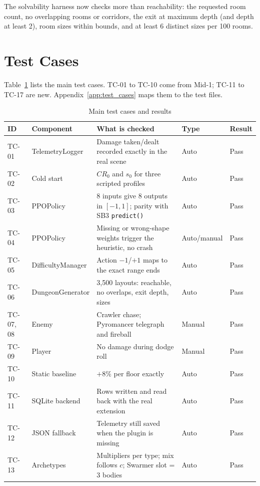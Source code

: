 The solvability harness now checks more than reachability: the requested room count, no overlapping rooms or corridors, the exit at maximum depth (and depth at least 2), room sizes within bounds, and at least 6 distinct sizes per 100 rooms.

\section{Test Cases}
Table~\ref{tab:test_cases} lists the main test cases. TC-01 to TC-10 come from Mid-1; TC-11 to TC-17 are new. Appendix~\ref{app:test_cases} maps them to the test files.

\begin{table}[!htbp]
\centering
\caption{Main test cases and results}
\label{tab:test_cases}
\scriptsize
\begin{tabular}{p{}p{}p{}p{}p{}}
\toprule
\textbf{ID} & \textbf{Component} & \textbf{What is checked} & \textbf{Type} & \textbf{Result} \\
\midrule
TC-01 & TelemetryLogger & Damage taken/dealt recorded exactly in the real scene & Auto & Pass \\
TC-02 & Cold start & $CR_0$ and $s_0$ for three scripted profiles & Auto & Pass \\
TC-03 & PPOPolicy & 8 inputs give 8 outputs in $[-1,1]$; parity with SB3 \texttt{predict()} & Auto & Pass \\
TC-04 & PPOPolicy & Missing or wrong-shape weights trigger the heuristic, no crash & Auto/manual & Pass \\
TC-05 & DifficultyManager & Action $-1$/$+1$ maps to the exact range ends & Auto & Pass \\
TC-06 & DungeonGenerator & 3,500 layouts: reachable, no overlaps, exit depth, sizes & Auto & Pass \\
TC-07, 08 & Enemy & Crawler chase; Pyromancer telegraph and fireball & Manual & Pass \\
TC-09 & Player & No damage during dodge roll & Manual & Pass \\
TC-10 & Static baseline & $+8\%$ per floor exactly & Auto & Pass \\
TC-11 & SQLite backend & Rows written and read back with the real extension & Auto & Pass \\
TC-12 & JSON fallback & Telemetry still saved when the plugin is missing & Auto & Pass \\
TC-13 & Archetypes & Multipliers per type; mix follows $c$; Swarmer slot = 3 bodies & Auto & Pass \\

\end{tabular}
\end{table}
